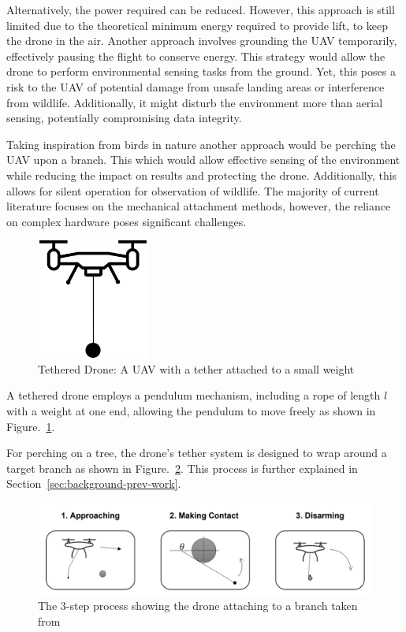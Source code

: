 Alternatively, the power required can be reduced.
However, this approach is still limited due to the theoretical minimum energy required to provide lift, to keep the drone in the air.
Another approach involves grounding the UAV temporarily, effectively pausing the flight to conserve energy.
This strategy would allow the drone to perform environmental sensing tasks from the ground.
Yet, this poses a risk to the UAV of potential damage from unsafe landing areas or interference from wildlife.
Additionally, it might disturb the environment more than aerial sensing, potentially compromising data integrity.

Taking inspiration from birds in nature another approach would be perching the UAV upon a branch.
This which would allow effective sensing of the environment while reducing the impact on results and protecting the drone.
Additionally, this allows for silent operation for observation of wildlife.
The majority of current literature focuses on the mechanical attachment methods, however, the reliance on complex hardware poses significant challenges.

\begin{figure}[H]
  \centering
  \includegraphics[width=0.33\textwidth]{introduction/TetheredDrone.drawio.png}
  \caption{Tethered Drone: A UAV with a tether attached to a small weight}
\label{fig:intro-tethered-drone}
\end{figure}

A tethered drone employs a pendulum mechanism, including a rope of length $l$ with a weight at one end, allowing the pendulum to move freely as shown in Figure.~\ref{fig:intro-tethered-drone}.

For perching on a tree, the drone's tether system is designed to wrap around a target branch as shown in Figure.~\ref{fig:intro-wrapping}.
This process is further explained in Section~\ref{sec:background-prev-work}.

\begin{figure}[htbp]
  \centering
  \includegraphics[width=\textwidth]{introduction/dronePerching.png}
  \caption{The 3-step process showing the drone attaching to a branch taken from~\cite{learnedTetheredPerchingFabian}}
\label{fig:intro-wrapping}
\end{figure}

